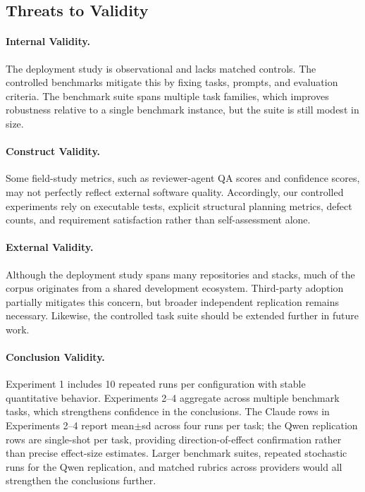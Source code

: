 \subsection{Threats to Validity}

\paragraph{Internal Validity.}
The deployment study is observational and lacks matched controls. The controlled benchmarks mitigate this by fixing tasks, prompts, and evaluation criteria. The benchmark suite spans multiple task families, which improves robustness relative to a single benchmark instance, but the suite is still modest in size.

\paragraph{Construct Validity.}
Some field-study metrics, such as reviewer-agent QA scores and confidence scores, may not perfectly reflect external software quality. Accordingly, our controlled experiments rely on executable tests, explicit structural planning metrics, defect counts, and requirement satisfaction rather than self-assessment alone.

\paragraph{External Validity.}
Although the deployment study spans many repositories and stacks, much of the corpus originates from a shared development ecosystem. Third-party adoption partially mitigates this concern, but broader independent replication remains necessary. Likewise, the controlled task suite should be extended further in future work.

\paragraph{Conclusion Validity.}
Experiment 1 includes 10 repeated runs per configuration with stable quantitative behavior. Experiments 2--4 aggregate across multiple benchmark tasks, which strengthens confidence in the conclusions. The Claude rows in Experiments 2--4 report mean$\pm$sd across four runs per task; the Qwen replication rows are single-shot per task, providing direction-of-effect confirmation rather than precise effect-size estimates. Larger benchmark suites, repeated stochastic runs for the Qwen replication, and matched rubrics across providers would all strengthen the conclusions further.
